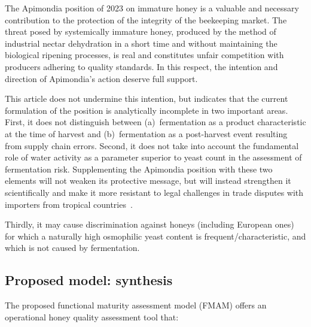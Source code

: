 The Apimondia position of 2023 on immature honey is a valuable and
necessary contribution to the protection of the integrity of the
beekeeping market. The threat posed by systemically immature honey,
produced by the method of industrial nectar dehydration in a short
time and without maintaining the biological ripening processes, is
real and constitutes unfair competition with producers adhering to
quality standards. In this respect, the intention and direction of
Apimondia's action deserve full support.

This article does not undermine this intention, but indicates that
the current formulation of the position is analytically incomplete
in two important areas. First, it does not distinguish between
(a)~fermentation as a product characteristic at the time of harvest
and (b)~fermentation as a post-harvest event resulting from supply
chain errors. Second, it does not take into account the fundamental
role of water activity as a parameter superior to yeast count in the
assessment of fermentation risk. Supplementing the Apimondia position
with these two elements will not weaken its protective message, but
will instead strengthen it scientifically and make it more resistant
to legal challenges in trade disputes with importers from tropical
countries~\cite{ruegg1981,tadele2025,analytica2020}.

Thirdly, it may cause discrimination against honeys (including
European ones) for which a naturally high osmophilic yeast content
is frequent/characteristic, and which is not caused by fermentation.

\subsection{Proposed model: synthesis}

The proposed functional maturity assessment model (FMAM) offers
an operational honey quality assessment tool that:

